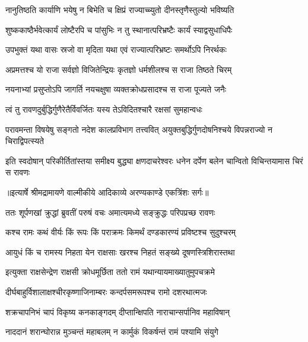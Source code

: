 \twolineshloka
{नानुतिष्ठति कार्याणि भयेषु न बिभेति च}
{क्षिप्रं राज्याच्च्युतो दीनस्तृणैस्तुल्यो भविष्यति} %

\twolineshloka
{शुष्ककाष्ठैर्भवेत्कार्यं लोष्टैरपि च पांसुभिः}
{न तु स्थानात्परिभ्रष्टैः कार्यं स्याद्वसुधाधिपैः} %

\twolineshloka
{उपभुक्तं यथा वासः स्रजो वा मृदिता यथा}
{एवं राज्यात्परिभ्रष्टः समर्थोऽपि निरर्थकः} %

\twolineshloka
{अप्रमत्तश्च यो राजा सर्वज्ञो विजितेन्द्रियः}
{कृतज्ञो धर्मशीलश्च स राजा तिष्ठते चिरम्} %

\twolineshloka
{नयनाभ्यां प्रसुप्तोऽपि जागर्ति नयचक्षुषा}
{व्यक्तक्रोधप्रसादश्च स राजा पूज्यते जनैः} %

\twolineshloka
{त्वं तु रावणदुर्बुद्धिर्गुणैरेतैर्विवर्जितः}
{यस्य तेऽविदितश्चारै रक्षसां सुमहान्वधः} %

\fourlineindentedshloka
{परावमन्ता विषयेषु सङ्गतो}
{नदेश कालप्रविभाग तत्त्ववित्}
{अयुक्तबुद्धिर्गुणदोषनिश्चये}
{विपन्नराज्यो न चिराद्विपत्स्यते} %

\fourlineindentedshloka
{इति स्वदोषान् परिकीर्तितांस्तया}
{समीक्ष्य बुद्ध्या क्षणदाचरेश्वरः}
{धनेन दर्पेण बलेन चान्वितो}
{विचिन्तयामास चिरं स रावणः} %


{॥इत्यार्षे श्रीमद्रामायणे वाल्मीकीये आदिकाव्ये अरण्यकाण्डे एकत्रिंशः सर्गः॥}


\twolineshloka
{ततः शूर्पणखां क्रुद्धां ब्रुवतीं परुषं वचः}
{अमात्यमध्ये सङ्क्रुद्धः परिपप्रच्छ रावणः} %

\twolineshloka
{कश्च रामः कथं वीर्यः किं रूपः किं पराक्रमः}
{किमर्थं दण्डकारण्यं प्रविष्टश्च सुदुश्चरम्} %

\twolineshloka
{आयुधं किं च रामस्य निहता येन राक्षसाः}
{खरश्च निहतं सङ्ख्ये दूषणस्त्रिशिरास्तथा} %

\twolineshloka
{इत्युक्ता राक्षसेन्द्रेण राक्षसी क्रोधमूर्छिता}
{ततो रामं यथान्यायमाख्यातुमुपचक्रमे} %

\twolineshloka
{दीर्घबाहुर्विशालाक्षश्चीरकृष्णाजिनाम्बरः}
{कन्दर्पसमरूपश्च रामो दशरथात्मजः} %

\twolineshloka
{शक्रचापनिभं चापं विकृष्य कनकाङ्गदम्}
{दीप्तान्क्षिपति नाराचान्सर्पानिव महाविषान्} %

\twolineshloka
{नाददानं शरान्घोरान्न मुञ्चन्तं महाबलम्}
{न कार्मुकं विकर्षन्तं रामं पश्यामि संयुगे} %

